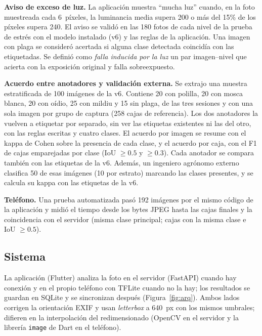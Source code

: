 \documentclass[sensors,article,submit,pdftex,moreauthors]{Definitions/mdpi}
\begin{document}
\textbf{Aviso de exceso de luz.} La aplicación muestra ``mucha luz'' cuando, en la foto muestreada cada 6~píxeles, la luminancia media supera 200 o más del 15\% de los píxeles supera 240. El aviso se validó en las 180 fotos de cada nivel de la prueba de estrés con el modelo instalado (v6) y las reglas de la aplicación. Una imagen con plaga se consideró acertada si alguna clase detectada coincidía con las etiquetadas. Se definió como \emph{falla inducida por la luz} un par imagen--nivel que acierta con la exposición original y falla sobreexpuesto.

\textbf{Acuerdo entre anotadores y validación externa.}\label{sec:acuerdo} Se extrajo una muestra estratificada de 100 imágenes de la v6. Contiene 20 con polilla, 20 con mosca blanca, 20 con oídio, 25 con mildiu y 15 sin plaga, de las tres sesiones y con una sola imagen por grupo de captura (258 cajas de referencia). Los dos anotadores la vuelven a etiquetar por separado, sin ver las etiquetas existentes ni las del otro, con las reglas escritas y cuatro clases. El acuerdo por imagen se resume con el kappa de Cohen sobre la presencia de cada clase, y el acuerdo por caja, con el F1 de cajas emparejadas por clase (IoU $\geq 0.5$ y $\geq 0.3$). Cada anotador se compara también con las etiquetas de la v6. Además, un ingeniero agrónomo externo clasifica 50 de esas imágenes (10 por estrato) marcando las clases presentes, y se calcula su kappa con las etiquetas de la v6.

\textbf{Teléfono.} Una prueba automatizada pasó 192 imágenes por el mismo código de la aplicación y midió el tiempo desde los bytes JPEG hasta las cajas finales y la coincidencia con el servidor (misma clase principal; cajas con la misma clase e IoU $\geq 0.5$).

\subsection{Sistema}

La aplicación (Flutter) analiza la foto en el servidor (FastAPI) cuando hay conexión y en el propio teléfono con TFLite cuando no la hay; los resultados se guardan en SQLite y se sincronizan después (Figura~\ref{fig:arq}). Ambos lados corrigen la orientación EXIF y usan \emph{letterbox} a 640~px con los mismos umbrales; difieren en la interpolación del redimensionado (OpenCV en el servidor y la librería \texttt{image} de Dart en el teléfono).
\end{document}
